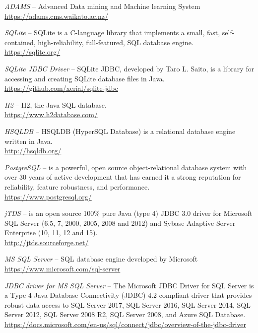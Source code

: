 
\begin{thebibliography}{999}

		\textit{ADAMS} -- Advanced Data mining and Machine learning System \\
		\url{https://adams.cms.waikato.ac.nz/}{}
		
		\textit{SQLite} -- SQLite is a C-language library that implements
		a small, fast, self-contained, high-reliability, full-featured,
		SQL database engine. \\
		\url{https://sqlite.org/}{}

		\textit{SQLite JDBC Driver} -- SQLite JDBC, developed by
		Taro L. Saito, is a library for accessing and creating SQLite
		database files in Java.  \\
		\url{https://github.com/xerial/sqlite-jdbc}{}

		\textit{H2} -- H2, the Java SQL database. \\
		\url{https://www.h2database.com/}{}

		\textit{HSQLDB} -- HSQLDB (HyperSQL Database) is a relational
		database engine written in Java. \\
		\url{http://hsqldb.org/}{}

		\textit{PostgreSQL} --  is a powerful, open source object-relational
		database system with over 30 years of active development that has
		earned it a strong reputation for reliability, feature robustness,
		and performance.  \\
		\url{https://www.postgresql.org/}{}

		\textit{jTDS} -- is an open source 100\% pure
		Java (type 4) JDBC 3.0 driver for Microsoft SQL Server (6.5, 7,
		2000, 2005, 2008 and 2012) and Sybase Adaptive Server Enterprise
		(10, 11, 12 and 15). \\
		\url{http://jtds.sourceforge.net/}{}

		\textit{MS SQL Server} -- SQL database engine developed by Microsoft \\
		\url{https://www.microsoft.com/sql-server}{}

		\textit{JDBC driver for MS SQL Server} -- The Microsoft JDBC Driver
		for SQL Server is a Type 4 Java Database Connectivity (JDBC) 4.2
		compliant driver that provides robust data access to SQL Server 2017,
		SQL Server 2016, SQL Server 2014, SQL Server 2012, SQL Server 2008 R2,
		SQL Server 2008, and Azure SQL Database. \\
		\url{https://docs.microsoft.com/en-us/sql/connect/jdbc/overview-of-the-jdbc-driver}{}

\end{thebibliography}

